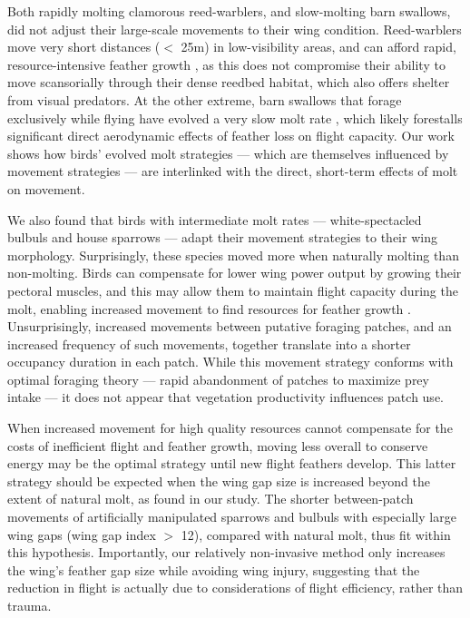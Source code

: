 \begin{refsection}
Both rapidly molting clamorous reed-warblers, and slow-molting barn swallows, did not adjust their large-scale movements to their wing condition.
Reed-warblers move very short distances ($<$ 25m) in low-visibility areas, and can afford rapid, resource-intensive feather growth \citep{lindstrom1993,newton2009,kiat2017}, as this does not compromise their ability to move scansorially through their dense reedbed habitat, which also offers shelter from visual predators.
At the other extreme, barn swallows that forage exclusively while flying have evolved a very slow molt rate \cite{kiat2016}, which likely forestalls significant direct aerodynamic effects of feather loss on flight capacity.
Our work shows how birds' evolved molt strategies --- which are themselves influenced by movement strategies \cite{kiat2016} --- are interlinked with the direct, short-term effects of molt on movement.

We also found that birds with intermediate molt rates --- white-spectacled bulbuls and house sparrows --- adapt their movement strategies to their wing morphology.
Surprisingly, these species moved more when naturally molting than non-molting.
Birds can compensate for lower wing power output by growing their pectoral muscles, and this may allow them to maintain flight capacity during the molt, enabling increased movement to find resources for feather growth \cite{chai1997,swaddle1997}.
Unsurprisingly, increased movements between putative foraging patches, and an increased frequency of such movements, together translate into a shorter occupancy duration in each patch.
While this movement strategy conforms with optimal foraging theory --- rapid abandonment of patches to maximize prey intake \cite{charnov1976} --- it does not appear that vegetation productivity influences patch use.

When increased movement for high quality resources \cite{charnov1976} cannot compensate for the costs of inefficient flight and feather growth, moving less overall to conserve energy may be the optimal strategy until new flight feathers develop.
This latter strategy should be expected when the wing gap size is increased beyond the extent of natural molt, as found in our study.
The shorter between-patch movements of artificially manipulated sparrows and bulbuls with especially large wing gaps (wing gap index $>$ 12), compared with natural molt, thus fit within this hypothesis.
Importantly, our relatively non-invasive method only increases the wing's feather gap size while avoiding wing injury, suggesting that the reduction in flight is actually due to considerations of flight efficiency, rather than trauma.


\end{refsection}
